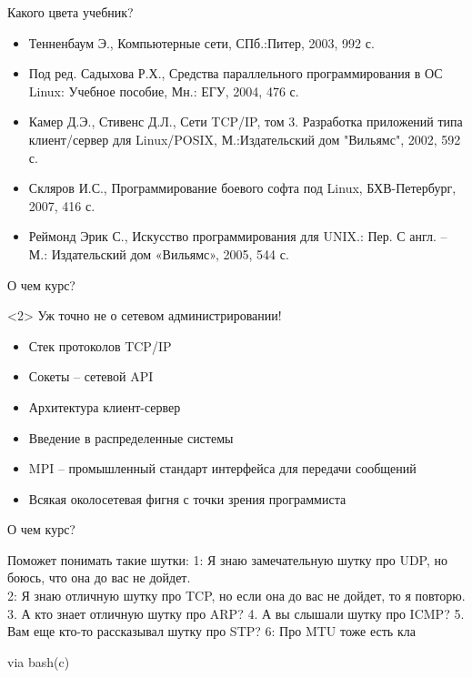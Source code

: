 \begin{frame}{Какого цвета учебник?}
	\begin{itemize}
		\item Тенненбаум Э.,  Компьютерные сети,  СПб.:Питер,  2003,  992 с.
		\item Под ред. Садыхова Р.Х.,  Средства параллельного программирования в ОС Linux: Учебное пособие,  Мн.: ЕГУ,  2004,  476 с.
		\item Камер Д.Э.,  Стивенс Д.Л.,  Сети TCP/IP,  том 3. Разработка приложений типа клиент/сервер для Linux/POSIX,  М.:Издательский дом "Вильямс",  2002,  592 с.
		\item Скляров И.С.,  Программирование боевого софта под Linux,  БХВ-Петербург,  2007,  416 с.
		\item Реймонд Эрик С.,  Искусство программирования для UNIX.: Пер. С англ. – М.: Издательский дом «Вильямс»,  2005,  544 с.
	\end{itemize}
\end{frame}



\begin{frame}{О чем курс?}
	\pause
	\begin{block}{}<2>
Уж точно не о сетевом администрировании!
	\end{block}
	\pause
	\begin{itemize}
		\item Стек протоколов TCP/IP
			\pause
		\item Сокеты -- сетевой API
			\pause
		\item Архитектура клиент-сервер
			\pause
		\item Введение в распределенные системы
			\pause
		\item MPI -- промышленный стандарт интерфейса для передачи сообщений
			\pause
		\item Всякая околосетевая фигня с точки зрения программиста
	\end{itemize}
\end{frame}

\begin{frame}{О чем курс?}

	\begin{block}{Поможет понимать такие шутки:}
1: Я знаю замечательную шутку про UDP, но боюсь, что она до вас не дойдет.\\
2: Я знаю отличную шутку про TCP, но если она до вас не дойдет, то я повторю.\\
3. А кто знает отличную шутку про ARP?
4. А вы слышали шутку про ICMP?
5. Вам еще кто-то рассказывал шутку про STP?
6: Про MTU тоже есть кла\\

	\end{block}

via bash(c)

\end{frame}


